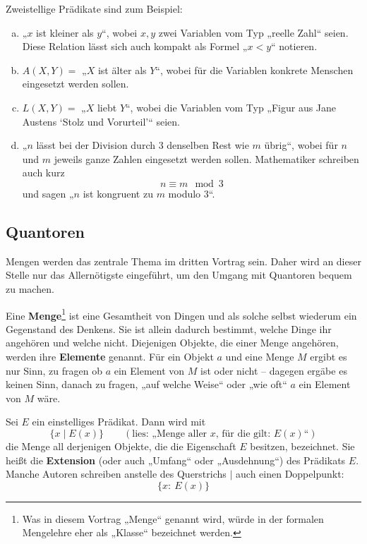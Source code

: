 \begin{bsp}
 Zweistellige Prädikate sind zum Beispiel:
 \begin{enumerate}[a)]
  \item „$x$ ist kleiner als $y$“, wobei $x,y$ zwei Variablen vom Typ „reelle Zahl“ seien. Diese Relation lässt sich auch kompakt als Formel „$x<y$“ notieren.
  \item $A(X,Y)=$ „$X$ ist älter als $Y$“, wobei für die Variablen konkrete Menschen eingesetzt werden sollen.
  \item $L(X,Y)=$ „$X$ liebt $Y$“, wobei die Variablen vom Typ „Figur aus Jane Austens `Stolz und Vorurteil'“ seien.
  \item „$n$ lässt bei der Division durch $3$ denselben Rest wie $m$ übrig“, wobei für $n$ und $m$ jeweils ganze Zahlen eingesetzt werden sollen. Mathematiker schreiben auch kurz
  \[ n\equiv m\mod 3 \]
  und sagen „$n$ ist kongruent zu $m$ modulo $3$“.
 \end{enumerate}
\end{bsp}





\subsection{Quantoren}
Mengen werden das zentrale Thema im dritten Vortrag sein. Daher wird an dieser Stelle nur das Allernötigste eingeführt, um den Umgang mit Quantoren bequem zu machen.%


\begin{de} \label{mengenimlogikkapitel}
 Eine \textbf{Menge}\footnote{Was in diesem Vortrag „Menge“ genannt wird, würde in der formalen Mengelehre eher als „Klasse“ bezeichnet werden.} ist eine Gesamtheit von Dingen und als solche selbst wiederum ein Gegenstand des Denkens. Sie ist allein dadurch bestimmt, welche Dinge ihr angehören und welche nicht. Diejenigen Objekte, die einer Menge angehören, werden ihre \textbf{Elemente} genannt. Für ein Objekt $a$ und eine Menge $M$ ergibt es nur Sinn, zu fragen ob $a$ ein Element von $M$ ist oder nicht -- dagegen ergäbe es keinen Sinn, danach zu fragen, „auf welche Weise“ oder „wie oft“ $a$ ein Element von $M$ wäre.
\end{de}


\begin{de} \label{extension}
 Sei $E$ ein einstelliges Prädikat. Dann wird mit
 \[ \{ x\mid E(x) \} \qquad (\text{lies: „Menge aller $x$, für die gilt: $E(x)$“})\]
 die Menge all derjenigen Objekte, die die Eigenschaft $E$ besitzen, bezeichnet. Sie heißt die \textbf{Extension} (oder auch „Umfang“ oder „Ausdehnung“) des Prädikats $E$. Manche Autoren schreiben anstelle des Querstrichs $\vert$ auch einen Doppelpunkt:
 \[ \{x:\ E(x) \}\]
\end{de}



